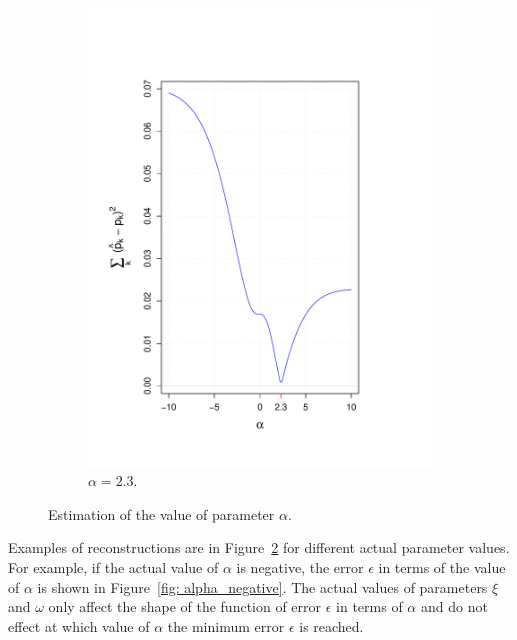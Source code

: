 \documentclass[10pt]{article}
\begin{document}
\begin{figure}[H]
\begin{subfigure}{.25\textwidth}
  \includegraphics[width=\linewidth]{alpha_trace_2_3_shift_0_2_scale_0_8.pdf}
  \caption{ $\alpha = 2.3$.}
  \label{fig: alpha_shift_and_scale}
\end{subfigure}%
\caption{ Estimation of the value of parameter $\alpha$.}
\label{fig: alpha_reconstruction}
\end{figure}

Examples of reconstructions are in Figure~\ref{fig: alpha_reconstruction} for different actual parameter values. For example, if the actual value of $\alpha$ is negative, the error $\epsilon$ in terms of the value of $\alpha$ is shown in Figure~\ref{fig: alpha_negative}. The actual values of parameters $\xi$ and $\omega$ only affect the shape of the function of error $\epsilon$ in terms of $\alpha$ and do not effect at which value of $\alpha$ the minimum error $\epsilon$ is reached.
\end{document}
